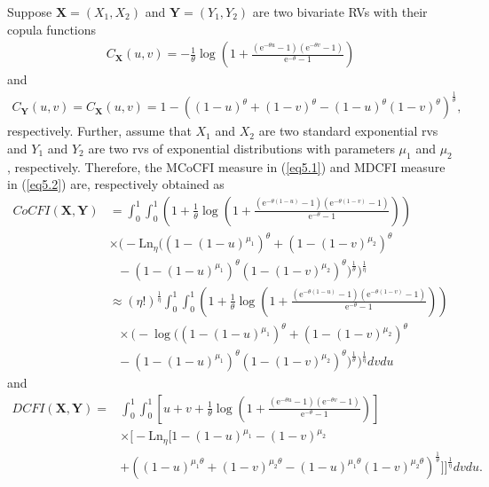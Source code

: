\documentclass[12pt, a4paper]{article}
\numberwithin{equation}{section}
\begin{document}
\begin{example}\label{ex5.1}
Suppose $\textbf{X}=(X_1,X_2)$ and $\textbf{Y}=(Y_1,Y_2)$ are two bivariate RVs with their copula functions 
\begin{align*}
 C_{\textbf{X}}(u,v)=-\frac{1}{\theta}\log\left(1+\frac{\left(\mathrm{e}^{-\theta u}-1\right)\left(\mathrm{e}^{-\theta v}-1\right)}{\mathrm{e}^{-\theta}-1}\right)
\end{align*}
and 
 \begin{align*}
 C_{\textbf{Y}}(u,v)= C_{\textbf{X}}(u,v)=1-\left((1-u)^\theta+(1-v)^\theta-(1-u)^\theta(1-v)^\theta\right)^{\frac{1}{\theta}},
\end{align*}
respectively. Further, assume that $X_1$ and $X_2$ are two standard exponential rvs and $Y_1$ and $Y_2$ are two rvs of exponential distributions with parameters $\mu_1$ and $\mu_2$, respectively. Therefore, the MCoCFI measure in (\ref{eq5.1}) and MDCFI measure in (\ref{eq5.2}) are, respectively obtained as
\begin{align}\label{eq5.5*}
CoCFI(\textbf{X},\textbf{Y})&=\int_{0}^{1}\int_{0}^{1}\left(1 +\frac{1}{\theta}\log\left(1+\frac{\left(\mathrm{e}^{-\theta (1-u)}-1\right)\left(\mathrm{e}^{-\theta (1-v)}-1\right)}{\mathrm{e}^{-\theta}-1}\right)\right)\nonumber\\
&\times\Big(-\mathrm{Ln}_\eta\big((1-(1-u)^{\mu_1})^\theta+(1-(1-v)^{\mu_2})^\theta\nonumber\\&~~~-(1-(1-u)^{\mu_1})^\theta (1-(1-v)^{\mu_2})^\theta\big)^{\frac{1}{\theta}}\Big)^{\frac{1}{\eta}}\nonumber\\
&\approx (\eta !)^{\frac{1}{\eta}}\int_{0}^{1}\int_{0}^{1} \left( 1+\frac{1}{\theta}\log\left(1+\frac{\left(\mathrm{e}^{-\theta (1-u)}-1\right)\left(\mathrm{e}^{-\theta (1-v)}-1\right)}{\mathrm{e}^{-\theta}-1}\right)\right)\nonumber\\
&~~~\times\Big(-\log\big((1-(1-u)^{\mu_1})^\theta+(1-(1-v)^{\mu_2})^\theta\nonumber\\&~~~-(1-(1-u)^{\mu_1})^\theta (1-(1-v)^{\mu_2})^\theta\big)^{\frac{1}{\theta}}\Big)^{\frac{1}{\eta}}dvdu
\end{align}
and 
\begin{align}\label{eq5.6*}
DCFI(\textbf{X},\textbf{Y})=&\int_{0}^{1}\int_{0}^{1}\left[u+v+\frac{1}{\theta}\log\left(1+\frac{\left(\mathrm{e}^{-\theta u}-1\right)\left(\mathrm{e}^{-\theta v}-1\right)}{\mathrm{e}^{-\theta}-1}\right)\right]\nonumber\\
&\times\Big[-\mathrm{Ln}_\eta\big[1-(1-u)^{\mu_1}-(1-v)^{\mu_2}\\&+\left((1-u)^{\mu_1\theta}+(1-v)^{\mu_2\theta}-(1-u)^{\mu_1\theta}(1-v)^{\mu_2\theta}\right)^{\frac{1}{\theta}}\big]\Big]^{\frac{1}{\eta}}dvdu.

\end{align}
\end{example}
\end{document}
